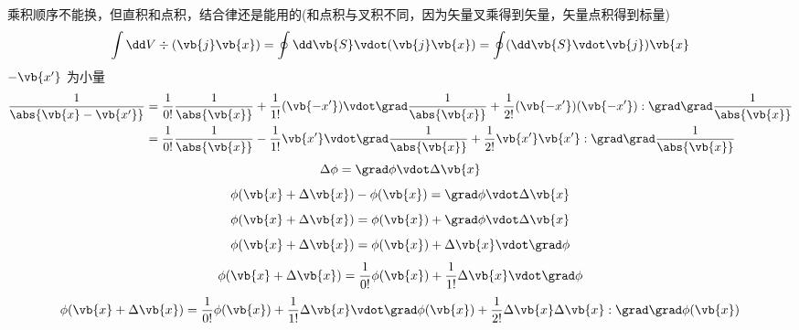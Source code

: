 
乘积顺序不能换，但直积和点积，结合律还是能用的(和点积与叉积不同，因为矢量叉乘得到矢量，矢量点积得到标量)
\begin{equation*}
	\int \dd V \div(\vb{j}\vb{x}) 
	= \oint \dd \vb{S} \vdot (\vb{j}\vb{x}) 
	= \oint (\dd \vb{S} \vdot \vb{j})\vb{x} 
\end{equation*}
\(- \vb{x'}\) 为小量
\begin{equation*}
	\begin{aligned}
	\frac{1}{ \abs{\vb{x} - \vb{x'}} }
	&= \frac{1}{0!} \frac{1}{\abs{\vb{x}}}
	+ \frac{1}{1!} (\vb{-x'}) \vdot \grad \frac{1}{\abs{\vb{x}}}
	+ \frac{1}{2!} (\vb{-x'}) (\vb{-x'}) : \grad\grad \frac{1}{\abs{\vb{x}}} \\
	&= \frac{1}{0!} \frac{1}{\abs{\vb{x}}}
	- \frac{1}{1!} \vb{x'} \vdot  \grad \frac{1}{\abs{\vb{x}}}
	+ \frac{1}{2!} \vb{x'}\vb{x'} : \grad\grad \frac{1}{\abs{\vb{x}}}
	\end{aligned}
\end{equation*}
\begin{equation*}
	\Delta \phi = \grad \phi \vdot \Delta \vb{x}
\end{equation*}
\begin{equation*}
	 \phi(\vb{x} + \Delta \vb{x}) - \phi(\vb{x})  = \grad \phi \vdot \Delta \vb{x}
\end{equation*}
\begin{equation*}
	 \phi(\vb{x} + \Delta \vb{x}) = \phi(\vb{x})  + \grad \phi \vdot \Delta \vb{x}
\end{equation*}
\begin{equation*}
	 \phi(\vb{x} + \Delta \vb{x}) = \phi(\vb{x})  +  \Delta \vb{x}\vdot \grad \phi
\end{equation*}
\begin{equation*}
	 \phi(\vb{x} + \Delta \vb{x}) = \frac{1}{0!} \phi(\vb{x})  + \frac{1}{1!} \Delta \vb{x}\vdot \grad \phi
\end{equation*}
\begin{equation*}
	 \phi(\vb{x} + \Delta \vb{x}) = \frac{1}{0!} \phi(\vb{x})  +
	 \frac{1}{1!} \Delta \vb{x}\vdot \grad \phi(\vb{x})
	 + \frac{1}{2!} \Delta \vb{x} \Delta \vb{x} : \grad \grad \phi(\vb{x}) 
\end{equation*}




